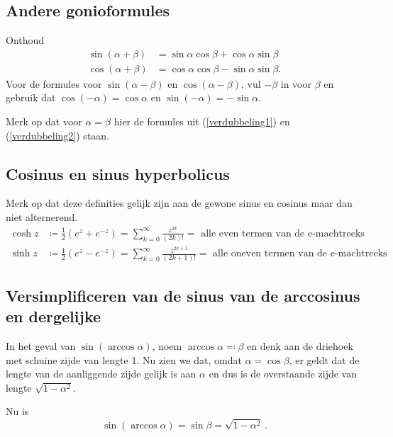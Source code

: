 \subsection{Andere gonioformules}

Onthoud
\begin{align*}
	\sin(\alpha + \beta) &= \sin \alpha \cos \beta + \cos \alpha \sin \beta \\
	\cos(\alpha + \beta) &= \cos \alpha \cos \beta - \sin \alpha \sin \beta .
\end{align*}
Voor de formules voor $\sin(\alpha - \beta)$ en $\cos(\alpha - \beta)$, vul $-\beta$ in voor $\beta$ en gebruik dat $\cos (-\alpha) = \cos \alpha $ en $\sin (-\alpha) = - \sin \alpha $.

Merk op dat voor $\alpha = \beta$ hier de formules uit (\ref{verdubbeling1}) en (\ref{verdubbeling2}) staan.



\subsection{Cosinus en sinus hyperbolicus}\label{subsec:cosinusEnSinusHyperbolicus}

Merk op dat deze definities gelijk zijn aan de gewone sinus en cosinus maar dan niet alternerend.
\begin{align*}
	\cosh z &\coloneqq \frac{1}{2} (e^z + e^{-z}) = \sum_{k=0}^\infty \frac{z^{2k}}{(2k)!} = \text{ alle even termen van de e-machtreeks} \\
	\sinh z &\coloneqq \frac{1}{2} (e^z - e^{-z}) = \sum_{k=0}^\infty \frac{z^{2k+1}}{(2k+1)!} = \text{ alle oneven termen van de e-machtreeks}
\end{align*}

\subsection{Versimplificeren van de sinus van de arccosinus en dergelijke}\label{subsec:versimplificerenVanDeSinusVanDeArccosinusEnDergelijke}

In het geval van $\sin (\arccos \alpha)$, noem $\arccos \alpha \eqqcolon \beta$ en denk aan de driehoek met schuine zijde van lengte 1.
Nu zien we dat, omdat $\alpha = \cos \beta$, er geldt dat de lengte van de aanliggende zijde gelijk is aan $\alpha$ en dus is de overstaande zijde van lengte $\sqrt{1-\alpha^2}$.
Nu is
\[ \sin (\arccos \alpha) = \sin \beta = \sqrt{1-\alpha^2}\,. \]
